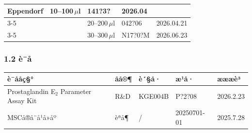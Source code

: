 \documentclass[UTF8,10pt,a4paper,fontset=fandol]{ctexart}
\newcommand{\fieldvalue}[1]{#1}
\newcommand{\handwritten}[1]{#1}
\begin{document}
\begin{center}
\begin{tabularx}{\textwidth}{|X|X|X|X|X|}
\fieldvalue{Eppendorf} &
\fieldvalue{\handwritten{10--100\,\(\mu\)l}} &
\fieldvalue{\handwritten{141?3?}} &
\fieldvalue{\handwritten{2026.04}}
\\ \cline{3-5}
&
&
\fieldvalue{\handwritten{20--200\,\(\mu\)l}} &
\fieldvalue{\handwritten{042?06}} &
\fieldvalue{\handwritten{2026.04.21}}
\\ \cline{3-5}
&
&
\fieldvalue{\handwritten{30--300\,\(\mu\)l}} &
\fieldvalue{\handwritten{N17?0?M}} &
\fieldvalue{\handwritten{2026.06.23}}
\\ \hline
\end{tabularx}
\normalsize

\subsubsection*{1.2 è¯å}

\begin{tabularx}{\textwidth}{|X|X|X|X|X|}
\hline
è¯ååç§° & åå®¶ & è´§å· & æ¹å· & æææè³ \\ \hline
Prostaglandin E$_2$ Parameter Assay Kit &
\fieldvalue{R\&D} &
\fieldvalue{KGE004B} &
\fieldvalue{\handwritten{P?2?08}} &
\fieldvalue{\handwritten{2026.2.23}}
\\ \hline
MSCå®å¨å¹å»åº &
\fieldvalue{èªå¶} &
\fieldvalue{/} &
\fieldvalue{\handwritten{20250701-01}} &
\fieldvalue{\handwritten{2025.7.28}}
\\ \hline
\end{tabularx}


\end{center}
\end{document}
